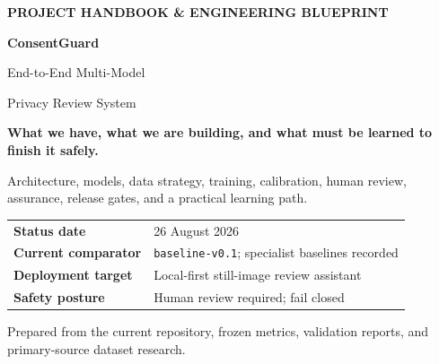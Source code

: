 \documentclass[11pt,a4paper,oneside]{scrreprt}
\newcommand{\file}[1]{\texttt{#1}}
\begin{document}
\begin{titlepage}
\pagecolor{CGPaper}

\vspace*{22mm}
{\sffamily\bfseries\fontsize{13}{16}\selectfont\color{CGSaffron} PROJECT HANDBOOK \& ENGINEERING BLUEPRINT\par}
\vspace{10mm}
{\sffamily\bfseries\fontsize{34}{40}\selectfont\color{white} ConsentGuard\par}
\vspace{2mm}
{\sffamily\fontsize{20}{25}\selectfont\color{CGMist} End-to-End Multi-Model\par Privacy Review System\par}

\vspace{40mm}
\begin{minipage}{0.72\textwidth}
{\sffamily\Large\bfseries\color{CGInk}What we have, what we are building, and what must be learned to finish it safely.\par}
\vspace{7mm}
{\large\color{CGSlate}Architecture, models, data strategy, training, calibration, human review, assurance, release gates, and a practical learning path.\par}
\vspace{13mm}
\begin{tabular}{@{}ll@{}}
\textbf{Status date} & 26 August 2026 \\
\textbf{Current comparator} & \file{baseline-v0.1}; specialist baselines recorded \\
\textbf{Deployment target} & Local-first still-image review assistant \\
\textbf{Safety posture} & Human review required; fail closed \\
\end{tabular}
\end{minipage}

\vfill
{\sffamily\small\color{CGSlate}Prepared from the current repository, frozen metrics, validation reports, and primary-source dataset research.\par}
\end{titlepage}
\nopagecolor
\end{document}
